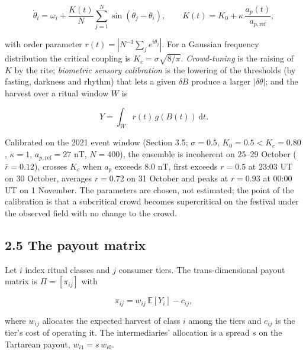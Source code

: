 \documentclass[
  10pt,
  a4paper,
]{article}
\begin{document}
\[\dot\theta_i = \omega_i + \frac{K(t)}{N}\sum_{j=1}^{N}\sin(\theta_j - \theta_i), \qquad K(t) = K_0 + \kappa\,\frac{a_p(t)}{a_{p,\mathrm{ref}}},\]

with order parameter \(r(t) = \left|N^{-1}\sum_j e^{i\theta_j}\right|\).
For a Gaussian frequency distribution the critical coupling is
\(K_c = \sigma\sqrt{8/\pi}\). \emph{Crowd-tuning} is the raising of
\(K\) by the rite; \emph{biometric sensory calibration} is the lowering
of the thresholds (by fasting, darkness and rhythm) that lets a given
\(\delta B\) produce a larger \(|\delta\theta|\); and the harvest over a
ritual window \(W\) is

\[Y = \int_W r(t)\,g(B(t))\,\mathrm{d}t.\]

Calibrated on the 2021 event window (Section 3.5; \(\sigma = 0.5\),
\(K_0 = 0.5 < K_c = 0.80\), \(\kappa = 1\), \(a_{p,\mathrm{ref}} = 27\)
nT, \(N = 400\)), the ensemble is incoherent on 25--29 October
(\(\bar r = 0.12\)), crosses \(K_c\) when \(a_p\) exceeds 8.0 nT, first
exceeds \(r = 0.5\) at 23:03 UT on 30 October, averages \(r = 0.72\) on
31 October and peaks at \(r = 0.93\) at 00:00 UT on 1 November. The
parameters are chosen, not estimated; the point of the calibration is
that a subcritical crowd becomes supercritical on the festival under the
observed field with no change to the crowd.

\hypertarget{the-payout-matrix}{%
\subsection{2.5 The payout matrix}\label{the-payout-matrix}}

Let \(i\) index ritual classes and \(j\) consumer tiers. The
trans-dimensional payout matrix is \(\Pi = [\pi_{ij}]\) with

\[\pi_{ij} = w_{ij}\,\mathbb E[Y_i] - c_{ij},\]

where \(w_{ij}\) allocates the expected harvest of class \(i\) among the
tiers and \(c_{ij}\) is the tier's cost of operating it. The
intermediaries' allocation is a spread \(s\) on the Tartarean payout,
\(w_{i1} = s\,w_{i0}\).
\end{document}
